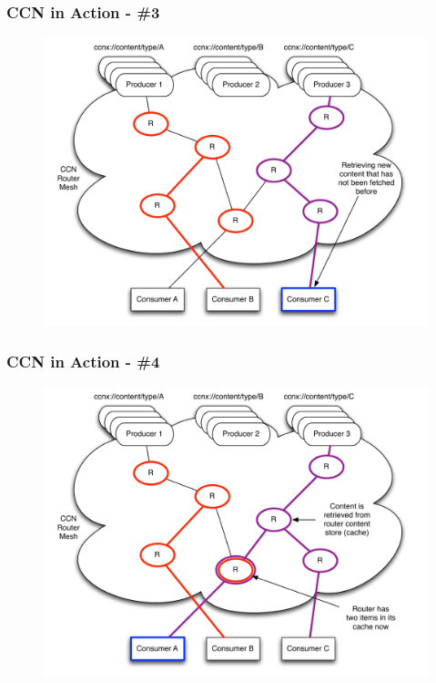 \documentclass[handout]{beamer}
\begin{document}
\begin{frame}
	\frametitle{CCN in Action - \#3}
	\begin{figure}[h]
		\includegraphics[scale=0.4]{img/ccn_img3.pdf}
	\end{figure}
\end{frame}

\begin{frame}
	\frametitle{CCN in Action - \#4}
	\begin{figure}[h]
		\includegraphics[scale=0.4]{img/ccn_img4.pdf}
	\end{figure}
\end{frame}
\end{document}

